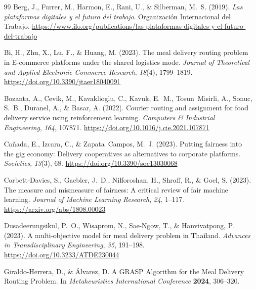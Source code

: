\documentclass[12pt,a4paper]{report}
\begin{document}
\begin{thebibliography}{99}
Berg, J., Furrer, M., Harmon, E., Rani, U., \& Silberman, M.~S. (2019).
\newblock \textit{Las plataformas digitales y el futuro del trabajo}.
\newblock Organizaci\'{o}n Internacional del Trabajo.
\newblock \url{https://www.ilo.org/publications/las-plataformas-digitales-y-el-futuro-del-trabajo}

Bi, H., Zhu, X., Lu, F., \& Huang, M. (2023).
\newblock The meal delivery routing problem in E-commerce platforms under the shared logistics mode.
\newblock \textit{Journal of Theoretical and Applied Electronic Commerce Research},
  \textit{18}(4), 1799--1819.
\newblock \url{https://doi.org/10.3390/jtaer18040091}

Bozanta, A., Cevik, M., Kavaklioglu, C., Kavuk, E.~M., Tosun~Misirli, A., Sonuc, S.~B., Duranel, A., \& Basar, A. (2022).
\newblock Courier routing and assignment for food delivery service using reinforcement learning.
\newblock \textit{Computers \& Industrial Engineering}, \textit{164}, 107871.
\newblock \url{https://doi.org/10.1016/j.cie.2021.107871}

Ca\~{n}ada, E., Izcara, C., \& Zapata~Campos, M.~J. (2023).
\newblock Putting fairness into the gig economy: Delivery cooperatives as alternatives to corporate platforms.
\newblock \textit{Societies}, \textit{13}(3), 68.
\newblock \url{https://doi.org/10.3390/soc13030068}

Corbett-Davies, S., Gaebler, J.~D., Nilforoshan, H., Shroff, R., \& Goel, S. (2023).
\newblock The measure and mismeasure of fairness: A critical review of fair machine learning.
\newblock \textit{Journal of Machine Learning Research}, \textit{24}, 1--117.
\newblock \url{https://arxiv.org/abs/1808.00023}

Dusadeerungsikul, P.~O., Wisaprom, N., Sae-Ngow, T., \& Hanvivatpong, P.
  (2023).
\newblock A multi-objective model for meal delivery problem in Thailand.
\newblock \textit{Advances in Transdisciplinary Engineering}, \textit{35}, 191--198.
\newblock \url{https://doi.org/10.3233/ATDE230044}

Giraldo-Herrera, D., \& \'{A}lvarez, D.
\newblock A GRASP Algorithm for the Meal Delivery Routing Problem.
\newblock In \emph{Metaheuristics International Conference} \textbf{2024}, 306--320.


\end{thebibliography}
\end{document}
